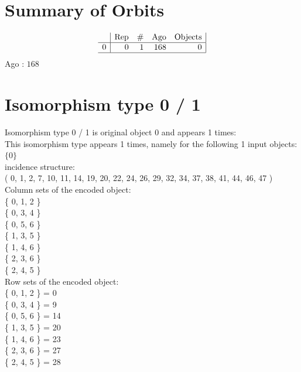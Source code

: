 \section*{Summary of Orbits}
$$
\begin{array}{r|*{4}{r}|}
 & \mbox{Rep} & \# & \mbox{Ago} & \mbox{Objects}\\
\hline
0 & 0 & 1 & 168 & 0\\
\hline
\end{array}
$$
Ago : $168$ \\
\section*{Isomorphism type 0 / 1}
Isomorphism type 0 / 1 is original object 0 and appears 1 times: \\
This isomorphism type appears 1 times, namely for the following 1 input objects: 
$
\{ 0 \}$\\
incidence structure: \\
( 0, 1, 2, 7, 10, 11, 14, 19, 20, 22, 24, 26, 29, 32, 34, 37, 38, 41, 44, 46, 47 )\\
Column sets of the encoded object:\\
\{ 0, 1, 2 \}\\
\{ 0, 3, 4 \}\\
\{ 0, 5, 6 \}\\
\{ 1, 3, 5 \}\\
\{ 1, 4, 6 \}\\
\{ 2, 3, 6 \}\\
\{ 2, 4, 5 \}\\
Row sets of the encoded object:\\
\{ 0, 1, 2 \} = 0\\
\{ 0, 3, 4 \} = 9\\
\{ 0, 5, 6 \} = 14\\
\{ 1, 3, 5 \} = 20\\
\{ 1, 4, 6 \} = 23\\
\{ 2, 3, 6 \} = 27\\
\{ 2, 4, 5 \} = 28\\
